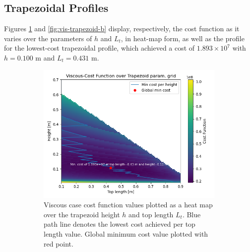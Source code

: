 \documentclass[11pt]{article}
\begin{document}
\subsection{Trapezoidal Profiles}
Figures \ref{fig:vis-trapezoid-a} and \ref{fig:vis-trapezoid-b} display, respectively, the cost function as it varies over the parameters of $h$ and $L_t$, in heat-map form, as well as the profile for the lowest-cost trapezoidal profile, which achieved a cost of $1.893\times 10^7$ with $h=0.100 \text{ m}$ and $L_t=0.431 \text{ m}$.
\begin{figure}[H]
\centering
\begin{subfigure}[b]{0.54\textwidth}
    \centering
    \includegraphics[width=\linewidth]{../results/viscous/trapezoids.png}
    \caption{Viscous case cost function values plotted as a heat map over the trapezoid height $h$ and top length $L_t$. Blue path line denotes the lowest cost achieved per top length value. Global minimum cost value plotted with red point.}
    \label{fig:vis-trapezoid-a}
\end{subfigure}
\hfill
\begin{subfigure}[b]{0.44\textwidth}
    \centering

\end{subfigure}
\end{figure}
\end{document}
